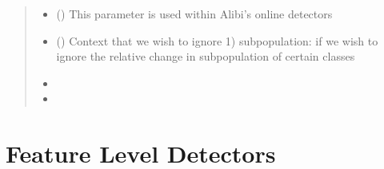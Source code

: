 \documentclass[letterpaper,10pt,english]{sphinxmanual}
\begin{document}
\begin{fulllineitems}
\begin{fulllineitems}
\begin{quote}
\begin{description}
\begin{itemize}
\item {} 
\sphinxAtStartPar
{} () \textendash{} This parameter is used within Alibi’s online detectors

\item {} 
\sphinxAtStartPar
{} () \textendash{} Context that we wish to ignore
1) sub\sphinxhyphen{}population: if we wish to ignore the relative change in sub\sphinxhyphen{}population of certain
classes

\end{itemize}

\sphinxAtStartPar
\begin{itemize}
\item {} 
\sphinxAtStartPar
{}

\item {} 
\sphinxAtStartPar
{}

\end{itemize}


\end{description}\end{quote}

\end{fulllineitems}


\begin{fulllineitems}
\label{\detokenize{alibiModules/alibiDetectors:alibiDetectors.alibiDetectors.run}}
\pysigstartsignatures
{}
\pysigstopsignatures
\end{fulllineitems}


\end{fulllineitems}


\sphinxstepscope


\chapter{Feature Level Detectors}
\label{\detokenize{fldModules/modules:feature-level-detectors}}\label{\detokenize{fldModules/modules::doc}}
\sphinxstepscope
\end{document}

